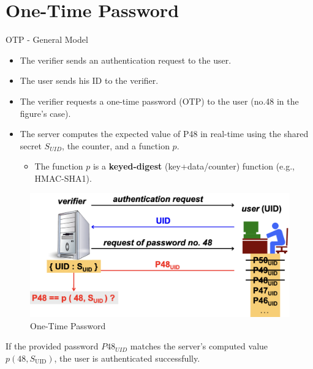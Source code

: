 \section{One-Time Password}
\begin{center}
    OTP - General Model
\end{center}
\begin{multicols}{2}

    \begin{itemize}
        \item The verifier sends an authentication request to the user.
        \item The user sends his ID to the verifier.
        \item The verifier requests a one-time password (OTP) to the user (no.48 in the figure's case).
        \item The server computes the expected value of P48 in real-time using the shared secret $S_{UID}$, the counter, and a function $p$.
        
        \begin{itemize}
            \item The function $p$ is a \textbf{keyed-digest} (key+data/counter) function (e.g., HMAC-SHA1).
        \end{itemize} 
    \end{itemize}

    \columnbreak

    \begin{figure}[H]
        \centering
        \includegraphics[width=\linewidth]{Images/Authentication/OTP.png}
        \caption{One-Time Password}
    \end{figure}
    
\end{multicols}
If the provided password  $P48_{UID}$  matches the server’s computed value  $p(48, S_{\text{UID}})$, the user is authenticated successfully.

